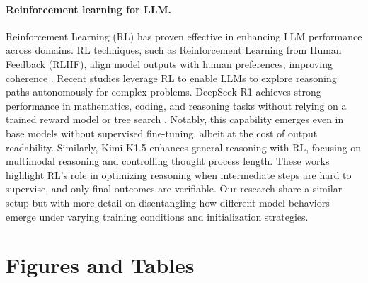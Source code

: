 \paragraph{Reinforcement learning for LLM.} Reinforcement Learning (RL) has proven effective in enhancing LLM performance across domains. RL techniques, such as Reinforcement Learning from Human Feedback (RLHF), align model outputs with human preferences, improving coherence \cite{ouyang2022training}. Recent studies \cite{kimi2025k15, deepseekai2025r1, lambert2024tulu} leverage RL to enable LLMs to explore reasoning paths autonomously for complex problems. DeepSeek-R1 \cite{deepseekai2025r1} achieves strong performance in mathematics, coding, and reasoning tasks without relying on a trained reward model \cite{lightman2023verifystep, wang2024multistep} or tree search \cite{feng2023alphazerolike, snell2024scaling}. Notably, this capability emerges even in base models without supervised fine-tuning, albeit at the cost of output readability. Similarly, Kimi K1.5 \cite{kimi2025k15} enhances general reasoning with RL, focusing on multimodal reasoning and controlling thought process length. These works highlight RL’s role in optimizing reasoning when intermediate steps are hard to supervise, and only final outcomes are verifiable. Our research share a similar setup but with more detail on disentangling how different model behaviors emerge under varying training conditions and initialization strategies.

\newpage
\section{Figures and Tables}


